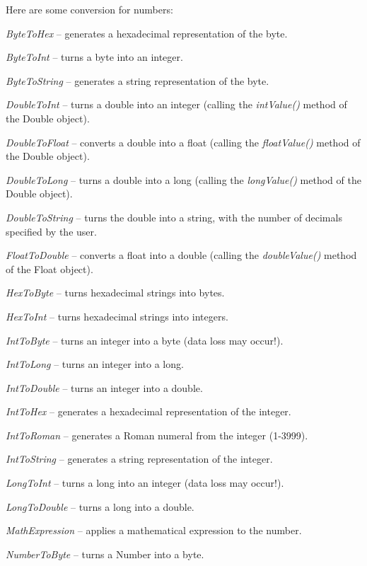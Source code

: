Here are some conversion for numbers:
\begin{tight_itemize}
	\item \textit{ByteToHex} -- generates a hexadecimal representation of the byte.
	\item \textit{ByteToInt} -- turns a byte into an integer.
	\item \textit{ByteToString} -- generates a string representation of the byte.
	\item \textit{DoubleToInt} -- turns a double into an integer (calling the
	\textit{intValue()} method of the Double object).
	\item \textit{DoubleToFloat} -- converts a double into a float (calling the 
	\textit{floatValue()} method of the Double object).
	\item \textit{DoubleToLong} -- turns a double into a long (calling the
	\textit{longValue()} method of the Double object).
	\item \textit{DoubleToString} -- turns the double into a string, with the number
	of decimals specified by the user.
	\item \textit{FloatToDouble} -- converts a float into a double (calling the 
	\textit{doubleValue()} method of the Float object).
	\item \textit{HexToByte} -- turns hexadecimal strings into bytes.
	\item \textit{HexToInt} -- turns hexadecimal strings into integers.
	\item \textit{IntToByte} -- turns an integer into a byte (data loss may occur!).
	\item \textit{IntToLong} -- turns an integer into a long.
	\item \textit{IntToDouble} -- turns an integer into a double.
	\item \textit{IntToHex} -- generates a hexadecimal representation of the integer.
	\item \textit{IntToRoman} -- generates a Roman numeral from the integer (1-3999).
	\item \textit{IntToString} -- generates a string representation of the integer.
	\item \textit{LongToInt} -- turns a long into an integer (data loss may occur!).
	\item \textit{LongToDouble} -- turns a long into a double.
	\item \textit{MathExpression} -- applies a mathematical expression to the number.
	\item \textit{NumberToByte} -- turns a Number into a byte.

\end{tight_itemize}
